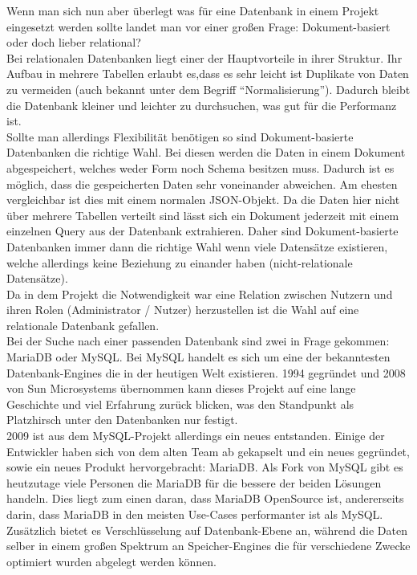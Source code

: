Wenn man sich nun aber überlegt was für eine Datenbank in einem Projekt eingesetzt werden sollte landet man vor einer großen Frage: Dokument-basiert oder doch lieber relational? \\
Bei relationalen Datenbanken liegt einer der Hauptvorteile in ihrer Struktur. Ihr Aufbau in mehrere Tabellen erlaubt es,dass es sehr leicht ist Duplikate von Daten zu vermeiden (auch bekannt unter dem Begriff ``Normalisierung''). Dadurch bleibt die Datenbank kleiner und leichter zu durchsuchen, was gut für die Performanz ist. \\

Sollte man allerdings Flexibilität benötigen so sind Dokument-basierte Datenbanken die richtige Wahl. Bei diesen werden die Daten in einem Dokument abgespeichert, welches weder Form noch Schema besitzen muss. Dadurch ist es möglich, dass die gespeicherten Daten sehr voneinander abweichen. Am ehesten vergleichbar ist dies mit einem normalen JSON-Objekt. Da die Daten hier nicht über mehrere Tabellen verteilt sind lässt sich ein Dokument jederzeit mit einem einzelnen Query aus der Datenbank extrahieren. Daher sind Dokument-basierte Datenbanken immer dann die richtige Wahl wenn viele Datensätze existieren, welche allerdings keine Beziehung zu einander haben (nicht-relationale Datensätze). \\

Da in dem Projekt die Notwendigkeit war eine Relation zwischen Nutzern und ihren Rolen (Administrator / Nutzer) herzustellen ist die Wahl auf eine relationale Datenbank gefallen. \\

Bei der Suche nach einer passenden Datenbank sind zwei in Frage gekommen: MariaDB oder MySQL. Bei MySQL handelt es sich um eine der bekanntesten Datenbank-Engines die in der heutigen Welt existieren. 1994 gegründet und 2008 von Sun Microsystems übernommen kann dieses Projekt auf eine lange Geschichte und viel Erfahrung zurück blicken, was den Standpunkt als Platzhirsch unter den Datenbanken nur festigt. \\
2009 ist aus dem MySQL-Projekt allerdings ein neues entstanden. Einige der Entwickler haben sich von dem alten Team ab gekapselt und ein neues gegründet, sowie ein neues Produkt hervorgebracht: MariaDB. Als Fork von MySQL gibt es heutzutage viele Personen die MariaDB für die bessere der beiden Lösungen handeln. Dies liegt zum einen daran, dass MariaDB OpenSource ist, andererseits darin, dass MariaDB in den meisten Use-Cases performanter ist als MySQL. Zusätzlich bietet es Verschlüsselung auf Datenbank-Ebene an, während die Daten selber in einem großen Spektrum an Speicher-Engines die für verschiedene Zwecke optimiert wurden abgelegt werden können. \\

